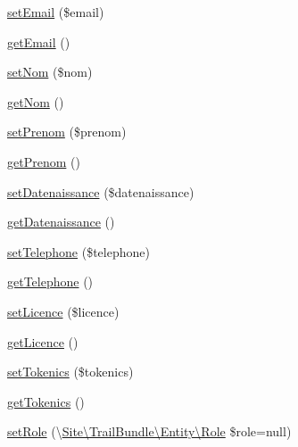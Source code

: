 \begin{DoxyCompactItemize}
\item 
\hyperlink{class_site_1_1_trail_bundle_1_1_entity_1_1_membre_a5ef76eef42d2624386442eeb636d338c}{set\+Email} (\$email)
\item 
\hyperlink{class_site_1_1_trail_bundle_1_1_entity_1_1_membre_a02a01849f28e2535e888ae4ec87b20f2}{get\+Email} ()
\item 
\hyperlink{class_site_1_1_trail_bundle_1_1_entity_1_1_membre_a3c162f28ffbb9c8026c0d84f722e5060}{set\+Nom} (\$nom)
\item 
\hyperlink{class_site_1_1_trail_bundle_1_1_entity_1_1_membre_a184f2299ee4553fa0782ea87c9aed362}{get\+Nom} ()
\item 
\hyperlink{class_site_1_1_trail_bundle_1_1_entity_1_1_membre_aab06d96cb012bde67fdbf4f8bfdad2a8}{set\+Prenom} (\$prenom)
\item 
\hyperlink{class_site_1_1_trail_bundle_1_1_entity_1_1_membre_a2a243ff78ccebcd417fd644325f44701}{get\+Prenom} ()
\item 
\hyperlink{class_site_1_1_trail_bundle_1_1_entity_1_1_membre_ae16699e773e40b1f1947c2c2a7967766}{set\+Datenaissance} (\$datenaissance)
\item 
\hyperlink{class_site_1_1_trail_bundle_1_1_entity_1_1_membre_a9e972bedb8c357d1ec6a83c614c36c7e}{get\+Datenaissance} ()
\item 
\hyperlink{class_site_1_1_trail_bundle_1_1_entity_1_1_membre_a9320befcdd01e8c5d3c780788870998e}{set\+Telephone} (\$telephone)
\item 
\hyperlink{class_site_1_1_trail_bundle_1_1_entity_1_1_membre_a326c966f9bae22a950b35abec70bf2d3}{get\+Telephone} ()
\item 
\hyperlink{class_site_1_1_trail_bundle_1_1_entity_1_1_membre_af8e417c8f962172fdae3b31ba2ff15df}{set\+Licence} (\$licence)
\item 
\hyperlink{class_site_1_1_trail_bundle_1_1_entity_1_1_membre_ad6ac8c87071c1f6c74ce5ecd61794790}{get\+Licence} ()
\item 
\hyperlink{class_site_1_1_trail_bundle_1_1_entity_1_1_membre_a0122c1fb40f3f50b360377f16119175e}{set\+Tokenics} (\$tokenics)
\item 
\hyperlink{class_site_1_1_trail_bundle_1_1_entity_1_1_membre_a1f483eabffc02f6067e0c8aa1da5eb60}{get\+Tokenics} ()
\item 
\hyperlink{class_site_1_1_trail_bundle_1_1_entity_1_1_membre_aad6233714e390a49a85e845012c247f0}{set\+Role} (\textbackslash{}\hyperlink{class_site_1_1_trail_bundle_1_1_entity_1_1_role}{Site\textbackslash{}\+Trail\+Bundle\textbackslash{}\+Entity\textbackslash{}\+Role} \$role=null)

\end{DoxyCompactItemize}
